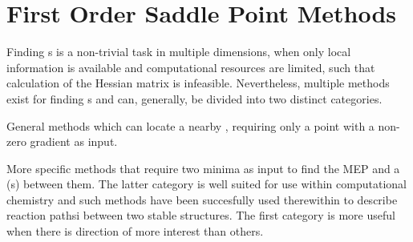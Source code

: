 \chapter{First Order Saddle Point Methods}
\label{chap:saddle-point-methods}


Finding \sap{}s is a non-trivial task in multiple dimensions, when only local information is available and computational resources are limited, such that calculation of the Hessian matrix is infeasible.
Nevertheless, multiple methods exist for finding s and can, generally, be divided into two distinct categories.
\item General methods which can locate a nearby , requiring only a point with a non-zero gradient as input.
\item More specific methods that require two minima as input to find the MEP and a  (s) between them.
\een
The latter category is well suited for use within computational chemistry and such methods have been succesfully used therewithin to describe reaction pathsi between two stable structures.\citemiss
The first category is more useful when there is direction of more interest than others.

\expand {}




